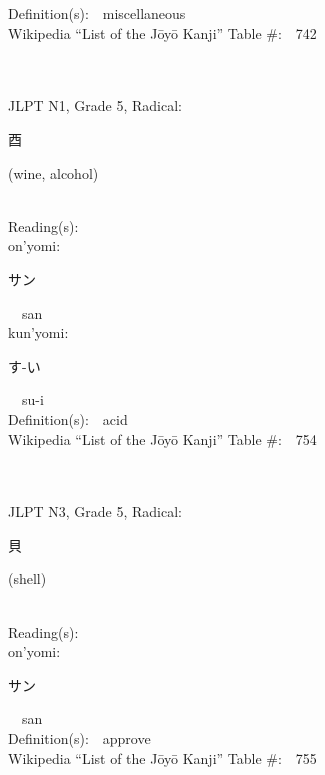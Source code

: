 \begin{multicols}{2}
Definition(s):\ \ miscellaneous \\
Wikipedia ``List of the J\=oy\=o Kanji'' Table \#:\ \ 742 \\
\ \ \\
{\fontsize{34pt}{40pt}  }\ \ \\  %
{JLPT N1, Grade 5, Radical:\ \ {\begin{CJK}{UTF8}{min} 酉 \end{CJK}} (wine, alcohol) } \\
Reading(s):\ \ \\
{\hspace*{1em}}on'yomi:\ \ \\
{\hspace*{2em}}{\begin{CJK}{UTF8}{min} サン \end{CJK}}\ \ san\ \ \\
{\hspace*{1em}}kun'yomi:\ \ \\
{\hspace*{2em}}{\begin{CJK}{UTF8}{min} す-い \end{CJK}}\ \ su-i\ \ \\
Definition(s):\ \ acid \\
Wikipedia ``List of the J\=oy\=o Kanji'' Table \#:\ \ 754 \\
\ \ \\
{\fontsize{34pt}{40pt}  }\ \ \\  %
{JLPT N3, Grade 5, Radical:\ \ {\begin{CJK}{UTF8}{min} 貝 \end{CJK}} (shell) } \\
Reading(s):\ \ \\
{\hspace*{1em}}on'yomi:\ \ \\
{\hspace*{2em}}{\begin{CJK}{UTF8}{min} サン \end{CJK}}\ \ san\ \ \\
Definition(s):\ \ approve \\
Wikipedia ``List of the J\=oy\=o Kanji'' Table \#:\ \ 755 \\

\end{multicols}
